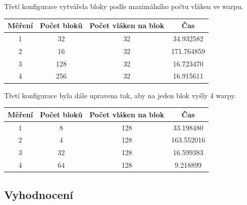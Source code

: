 \documentclass[12pt]{article}
\begin{document}
Třetí konfigurace vytvářela bloky podle maximálního počtu vláken ve warpu.
\begin{center}
\begin{tabular}{c | c | c | c}
\textbf{Měření} & \textbf{Počet bloků} & \textbf{Počet vláken na blok} & \textbf{Čas} \\ \hline \hline
1 & 32 & 32 & 34.932582 \\ \hline
2 & 16 & 32 & 171.764859 \\ \hline
3 & 128 & 32 & 16.723470 \\ \hline
4 & 256 & 32 & 16.915611 \\ \hline
\end{tabular}
\end{center}

Třetí konfigurace byla dále upravena tak, aby na jeden blok vyšly 4 warpy.
\begin{center}
\begin{tabular}{c | c | c | c}
\textbf{Měření} & \textbf{Počet bloků} & \textbf{Počet vláken na blok} & \textbf{Čas} \\ \hline \hline
1 & 8 & 128 & 33.198480 \\ \hline
2 & 4 & 128 & 163.552016 \\ \hline
3 & 32 & 128 & 16.599383 \\ \hline
4 & 64 & 128 & 9.218899 \\ \hline
\end{tabular}
\end{center}




\subsection{Vyhodnocení}
\end{document}
